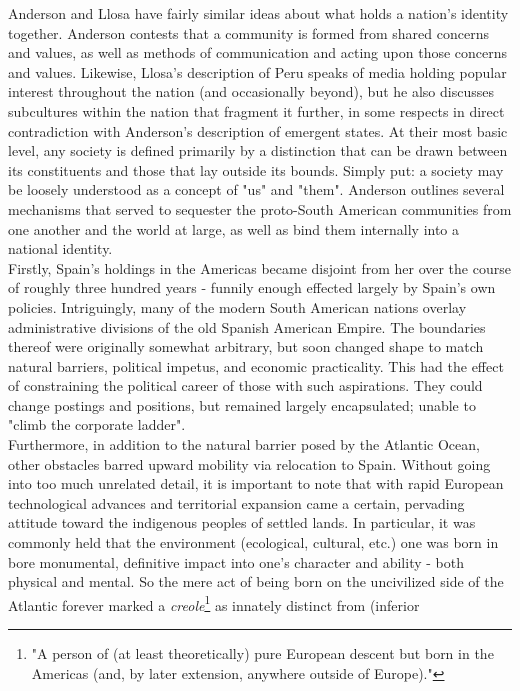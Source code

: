\documentclass[12pt]{report}
\begin{document}
\doublespacing
\indent Anderson and Llosa have fairly similar ideas about what holds a
nation's identity together. Anderson contests that a community is formed
from shared concerns and values, as well as methods of communication and
acting upon those concerns and values. Likewise, Llosa's description of
Peru speaks of media holding popular interest throughout the nation (and
occasionally beyond), but he also discusses subcultures within the nation
that fragment it further, in some respects in direct contradiction with
Anderson's description of emergent states.
\indent At their most basic level, any society is defined primarily by a
distinction that can be drawn between its constituents and those that lay
outside its bounds. Simply put: a society may be loosely understood as a
concept of "us" and "them". Anderson outlines several mechanisms that
served to sequester the proto-South American communities from one another
and the world at large, as well as bind them internally into a national
identity.\\
\indent Firstly, Spain's holdings in the Americas became disjoint from
her over the course of roughly three hundred years - funnily enough
effected largely by Spain's own policies. Intriguingly, many of the modern
South American nations overlay administrative divisions of the old Spanish
American Empire\cite{bib:commie}. The boundaries thereof were originally
somewhat arbitrary, but soon changed shape to match natural barriers,
political impetus, and economic practicality. This had the effect of
constraining the political career of those with such aspirations. They
could change postings and positions, but remained largely encapsulated;
unable to "climb the corporate ladder".\\
\indent Furthermore, in addition to the natural barrier posed by the
Atlantic Ocean, other obstacles barred upward mobility via relocation to
Spain. Without going into too much
unrelated detail, it is important to note that with rapid European
technological advances and territorial expansion came a certain, pervading
attitude toward the indigenous peoples of settled lands. In particular, it
was commonly held that the environment (ecological, cultural, etc.) one
was born in bore monumental, definitive impact into one's character and
ability - both physical and mental. So the mere act of being born on the
uncivilized side of the Atlantic forever marked a
\emph{creole}\footnote{"A person of (at least theoretically) pure European
descent but born in the Americas (and, by later extension, anywhere
outside of Europe)."\cite{bib:commie}} as innately distinct from (inferior
\end{document}
